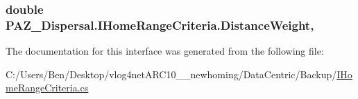 \hypertarget{interface_p_a_z___dispersal_1_1_i_home_range_criteria_acfb4d7a7f1ec27a5eeeff4ca3864a894}{
\subsubsection[{Distance\-Weight}]{\setlength{\rightskip}{0pt plus 5cm}double P\-A\-Z\-\_\-\-Dispersal.\-I\-Home\-Range\-Criteria.\-Distance\-Weight\hspace{0.3cm}{\ttfamily [get]}, {\ttfamily [set]}}}\label{interface_p_a_z___dispersal_1_1_i_home_range_criteria_acfb4d7a7f1ec27a5eeeff4ca3864a894}


The documentation for this interface was generated from the following file\-:\begin{DoxyCompactItemize}
\item 
C\-:/\-Users/\-Ben/\-Desktop/vlog4net\-A\-R\-C10\-\_\-\_\-newhoming/\-Data\-Centric/\-Backup/\hyperlink{_backup_2_i_home_range_criteria_8cs}{I\-Home\-Range\-Criteria.\-cs}\end{DoxyCompactItemize}
